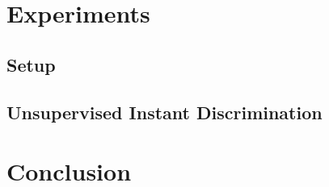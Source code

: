 \documentclass{article}
\begin{document}
\section{Experiments}
\subsection{Setup}

\subsection{Unsupervised Instant Discrimination}

\section{Conclusion}

 
\small{}

% 
\end{document}

